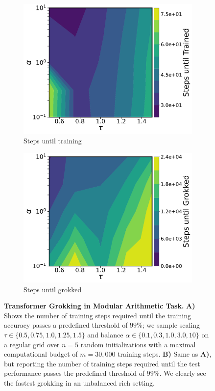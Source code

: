 \documentclass{article}
\theoremstyle{plain}
\theoremstyle{definition}
\theoremstyle{remark}
\begin{document}
\begin{figure}[H]
    \begin{subfigure}{0.49\textwidth}
        \centering
        \includegraphics[width=\linewidth]{fig/deep-networks/grokking/grok_trained.pdf}
        \caption{Steps until training}
    \end{subfigure}
    \begin{subfigure}{0.49\textwidth}
        \centering
        \includegraphics[width=\linewidth]{fig/deep-networks/grokking/grok_grokked.pdf}
        \caption{Steps until grokked}
    \end{subfigure}
    \caption{\textbf{Transformer Grokking in Modular Arithmetic Task.}
    \textbf{A)} Shows the number of training steps required until the training accuracy passes a predefined threshold of $99\%$; we sample scaling $\tau \in \{0.5, 0.75, 1.0, 1.25, 1.5 \}$ \citep{kumar2023grokking} and balance $\alpha \in \{0.1, 0.3, 1.0, 3.0, 10 \}$ on a regular grid over $n=5$ random initializations with a maximal computational budget of $m=30,000$ training steps.
    \textbf{B)} Same as \textbf{A)}, but reporting the number of training steps required until the test performance passes the predefined threshold of $99\%$. We clearly see the fastest grokking in an unbalanced rich setting.
    }
    \label{fig:grokking}
\end{figure}
\end{document}
